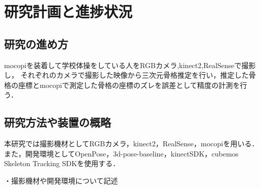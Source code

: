 \documentclass[titlepage]{jarticle}
\begin{document}
%
%
%

%
%
%
%
%

%
%
%
%
\section{研究計画と進捗状況}
%

%
%
\subsection{研究の進め方}
%
mocopiを装着して学校体操をしている人をRGBカメラ,kinect2,RealSenseで撮影し，
それぞれのカメラで撮影した映像から三次元骨格推定を行い，推定した骨格の座標とmocopiで測定した骨格の座標のズレを誤差として精度の計測を行う．
%
%
%
\subsection{研究方法や装置の概略}
%
本研究では撮影機材としてRGBカメラ，kinect2，RealSense，mocopiを用いる．また，開発環境としてOpenPose，3d-pose-baseline，kinectSDK，cubemos Skeleton Tracking SDKを使用する．

・撮影機材や開発環境について記述



%
\end{document}
